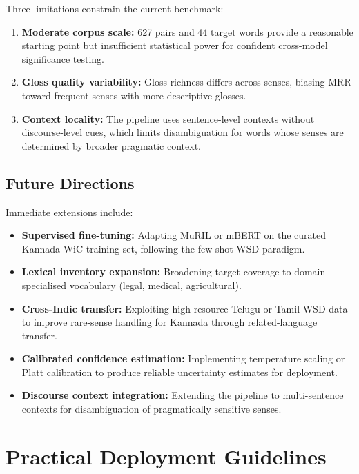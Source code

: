 \documentclass{ieeeaccess}
\begin{document}
Three limitations constrain the current benchmark:
\begin{enumerate}
  \item \textbf{Moderate corpus scale:} 627 pairs and 44 target words provide
        a reasonable starting point but insufficient statistical power for
        confident cross-model significance testing.
  \item \textbf{Gloss quality variability:} Gloss richness differs across
        senses, biasing MRR toward frequent senses with more descriptive
        glosses.
  \item \textbf{Context locality:} The pipeline uses sentence-level contexts
        without discourse-level cues, which limits disambiguation for words
        whose senses are determined by broader pragmatic context.
\end{enumerate}

\subsection{Future Directions}

Immediate extensions include:
\begin{itemize}
  \item \textbf{Supervised fine-tuning:} Adapting MuRIL or mBERT on the
        curated Kannada WiC training set, following the few-shot WSD paradigm.
  \item \textbf{Lexical inventory expansion:} Broadening target coverage to
        domain-specialised vocabulary (legal, medical, agricultural).
  \item \textbf{Cross-Indic transfer:} Exploiting high-resource Telugu or
        Tamil WSD data to improve rare-sense handling for Kannada through
        related-language transfer.
  \item \textbf{Calibrated confidence estimation:} Implementing temperature
        scaling or Platt calibration to produce reliable uncertainty estimates
        for deployment.
  \item \textbf{Discourse context integration:} Extending the pipeline to
        multi-sentence contexts for disambiguation of pragmatically sensitive
        senses.
\end{itemize}

\section{Practical Deployment Guidelines}
\label{sec:deploy}
\end{document}
